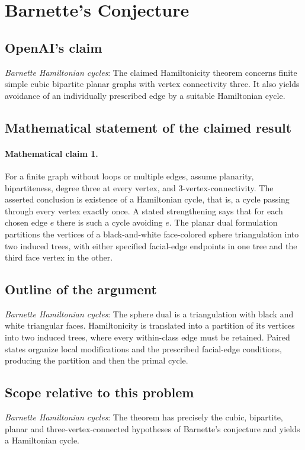 \documentclass[11pt]{article}
\begin{document}
\section*{Barnette's Conjecture}

\subsection{OpenAI's claim}
\textit{Barnette Hamiltonian cycles}: The claimed Hamiltonicity theorem concerns finite simple cubic bipartite planar graphs with vertex connectivity three. It also yields avoidance of an individually prescribed edge by a suitable Hamiltonian cycle.

\subsection{Mathematical statement of the claimed result}
\paragraph{Mathematical claim 1.} For a finite graph without loops or multiple edges, assume planarity, bipartiteness, degree three at every vertex, and $3$-vertex-connectivity. The asserted conclusion is existence of a Hamiltonian cycle, that is, a cycle passing through every vertex exactly once. A stated strengthening says that for each chosen edge $e$ there is such a cycle avoiding $e$. The planar dual formulation partitions the vertices of a black-and-white face-colored sphere triangulation into two induced trees, with either specified facial-edge endpoints in one tree and the third face vertex in the other.

\subsection{Outline of the argument}
\textit{Barnette Hamiltonian cycles}: The sphere dual is a triangulation with black and white triangular faces. Hamiltonicity is translated into a partition of its vertices into two induced trees, where every within-class edge must be retained. Paired states organize local modifications and the prescribed facial-edge conditions, producing the partition and then the primal cycle.

\subsection{Scope relative to this problem}
\textit{Barnette Hamiltonian cycles}: The theorem has precisely the cubic, bipartite, planar and three-vertex-connected hypotheses of Barnette’s conjecture and yields a Hamiltonian cycle.
\end{document}
